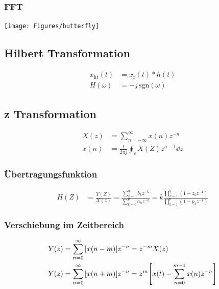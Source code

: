 \documentclass[10pt,a4paper]{article}
\begin{document}
  \subsubsection{FFT}
  \begin{center}
    \texttt{[image: Figures/butterfly]}
  \end{center}
  \pagebreak
  \subsection{Hilbert Transformation}
  \begin{mdframed}[style=exercise]
    \begin{align}
      x_{\mathrm{ht}}(t) &= x_{\mathrm{r}}(t) * h(t)\\
      H(\omega) &= -j \, \text{sgn}(\omega)
    \end{align}
  \end{mdframed}
  \subsection{z Transformation}
  \begin{mdframed}[style=exercise]
    \begin{align}
      X(z) &= \sum_{n=-\infty}^{\infty} x(n) z^{-n}\\
      x(n) &= \frac{1}{2\pi j} \oint_c X(Z) z^{n-1}\dd{z}
    \end{align}
  \end{mdframed}
  \subsubsection{Übertragungsfunktion}
  \begin{mdframed}[style=exercise]
    \begin{align}
      H(Z) &=\frac{Y(Z)}{X(z)}=\frac{\sum_{k=0}^q b_k z^{-k}}{\sum_{k=0}^p a_k z^{-k}}=k\frac{\prod_{k=1}^q (1-z_k z^{-1})}{\prod_{k=1}^p (1-p_k z^{-1})}
    \end{align}
  \end{mdframed}
  \subsubsection{Verschiebung im Zeitbereich}
  \begin{mdframed}[style=exercise]
    \begin{align}
      Y(z) &= \sum_{n=0}^{\infty} \qty[x(n-m)] z^{-n} =  z^{-m} X(z)\\
      Y(z) &= \sum_{n=0}^{\infty}\qty[x(n+m)]z^{-n} = z^{m}\qty[x(t)-\sum_{n=0}^{m-1} x(n) z^{-n}]
    \end{align}
  \end{mdframed}
\end{document}
